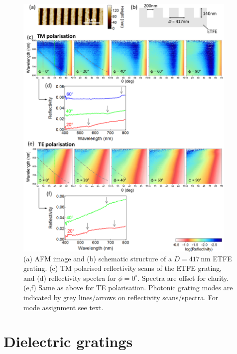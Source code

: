 \begin{figure}[h!] 
\centering    
\includegraphics[width=0.95\textwidth]{Fig2}
\caption[(a) AFM image and (b) schematic structure of a $D=417$\,nm ETFE grating. Reflectivity measurements of the ETFE grating in (c,d) TM and (e.f) TE polarisation.]{(a) AFM image and (b) schematic structure of a $D=417$\,nm ETFE grating. (c) TM polarised reflectivity scans of the ETFE grating, and (d) reflectivity spectra for $\phi=0^{\circ}$. Spectra are offset for clarity. (e,f) Same as above for TE polarisation. Photonic grating modes are indicated by grey lines/arrows on reflectivity scans/spectra. For mode assignment see text.}
\label{7Fig2}
\end{figure}
\section{Dielectric gratings}
